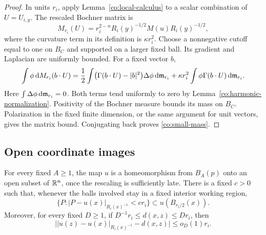 \begin{proof}
In units \(r_i\), apply Lemma~\ref{co:local-calculus} to a scalar
combination of \(U=U_{i,y}\).  The rescaled Bochner matrix is
\begin{equation}\label{co:M-scaling}
 M_{r_i}(U)=r_i^{2-n}R_i(y)^{-1/2}M(u)R_i(y)^{-1/2},
\end{equation}
where the curvature term in its definition is
\(\kappa r_i^2\).  Choose a nonnegative cutoff equal to one on
\(B_C\) and supported on a larger fixed ball.  Its gradient and
Laplacian are uniformly bounded.  For a fixed vector \(b\),
\[
 \int\phi\,\mathrm d M_{r_i}(b\cdot U)
 =\frac12\int\bigl(\Gamma(b\cdot U)-|b|^2\bigr)
                  \Delta\phi\,\mathrm d\mathfrak m_{r_i}
  +\kappa r_i^2\int\phi\Gamma(b\cdot U)\,\mathrm d\mathfrak m_{r_i}.
\]
Here \(\int\Delta\phi\,\mathrm d\mathfrak m_{r_i}=0\).  Both terms tend uniformly
to zero by Lemma~\ref{co:harmonic-normalization}.  Positivity of
the Bochner measure bounds its mass on \(B_C\).  Polarization in
the fixed finite dimension, or the same argument for unit
vectors, gives the matrix bound.  Conjugating back proves
\eqref{co:small-mass}.
\end{proof}

\subsection{Open coordinate images}

\begin{lemma}\label{co:open-coordinates}
For every fixed \(A\ge1\), the map \(u\) is a homeomorphism
from \(B_A(p)\) onto an open subset of \(\mathbb R^n\), once the
rescaling is sufficiently late.  There is a fixed \(c>0\) such
that, whenever the balls involved stay in a fixed interior
working region,
\begin{equation}\label{co:ellipsoid-containment}
 \{P:|P-u(x)|_{R_i(x)^{-1}}<c r_i\}
 \subset u(B_{r_i/2}(x)).
\end{equation}
Moreover, for every fixed \(D\ge1\), if
\(D^{-1}r_i\le d(x,z)\le Dr_i\), then
\begin{equation}\label{co:separation-scale}
 \bigl||u(z)-u(x)|_{R_i(x)^{-1}}-d(x,z)\bigr|
 \le o_D(1)r_i.
\end{equation}
\end{lemma}

